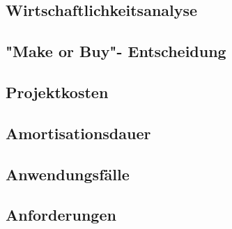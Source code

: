 \subsection{Wirtschaftlichkeitsanalyse}
\label{wirtschaftlichkeitsanalyse}

\subsection{"Make or Buy"- Entscheidung}
\label{makeOrBuy}

\subsection{Projektkosten}
\label{projektkosten}

\subsection{Amortisationsdauer}
\label{amortisationsdauer}

\subsection{Anwendungsfälle}
\label{anwednungsfaelle}

\subsection{Anforderungen}
\label{anforderungen}


